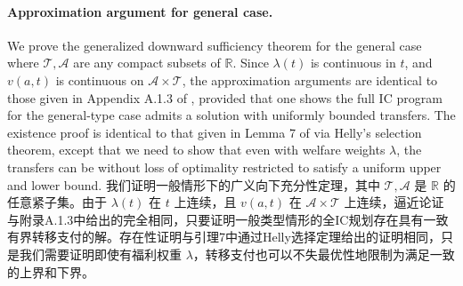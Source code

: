 \documentclass[12pt,letterpaper]{article}
\newenvironment{original}{\color{black}\noindent}{}
\newenvironment{translation}{\color{blue}\noindent}{}
\theoremstyle{plain}
\theoremstyle{definition}
\theoremstyle{remark}
\newcommand{\R}{\mathds{R}}
\renewcommand{\1}{\mathds{1}}
\theoremstyle{definition}
\begin{document}
\paragraph{Approximation argument for general case.}\hspace{-2mm}\begin{original}We prove the generalized downward sufficiency theorem for the general case where $\mathcal{T}, \mathcal{A}$ are any compact subsets of $\R$. Since $\lambda(t)$ is continuous in $t$, and $v(a, t)$ is continuous on $\mathcal{A} \times \mathcal{T}$, the approximation arguments are identical to those given in Appendix A.1.3 of \citet{yang2022costly}, provided that one shows the full IC program for the general-type case admits a solution with uniformly bounded transfers. The existence proof is identical to that given in Lemma 7 of \citet{yang2022costly} via Helly's selection theorem, except that we need to show that even with welfare weights $\lambda$, the transfers can be without loss of optimality restricted to satisfy a uniform upper and lower bound.
\end{original}
\begin{translation}
我们证明一般情形下的广义向下充分性定理，其中 $\mathcal{T}, \mathcal{A}$ 是 $\R$ 的任意紧子集。由于 $\lambda(t)$ 在 $t$ 上连续，且 $v(a, t)$ 在 $\mathcal{A} \times \mathcal{T}$ 上连续，逼近论证与\citet{yang2022costly}附录A.1.3中给出的完全相同，只要证明一般类型情形的全IC规划存在具有一致有界转移支付的解。存在性证明与\citet{yang2022costly}引理7中通过Helly选择定理给出的证明相同，只是我们需要证明即使有福利权重 $\lambda$，转移支付也可以不失最优性地限制为满足一致的上界和下界。
\end{translation}
\end{document}
